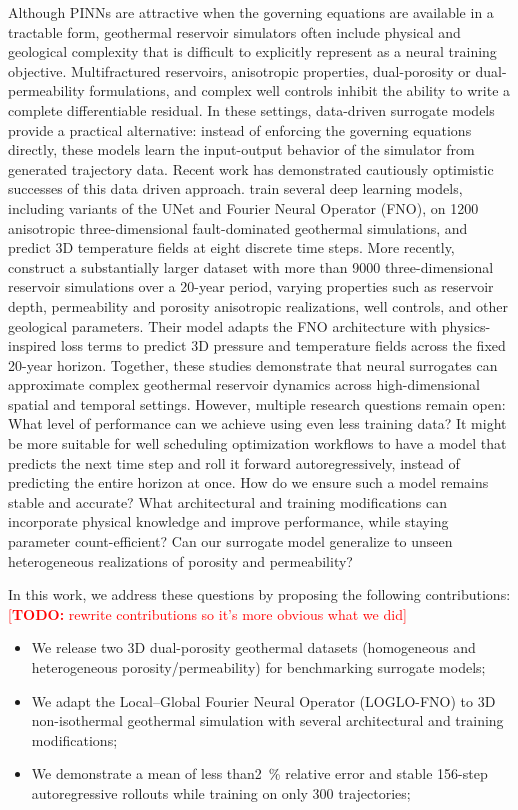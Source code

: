 \documentclass[pdflatex,sn-mathphys-ay]{sn-jnl}
\newcommand{\todo}[1]{\textcolor{red}{[\textbf{TODO:} #1]}}
\begin{document}
Although PINNs are attractive when the governing equations are available in a
tractable form, geothermal reservoir simulators often include physical and
geological complexity that is difficult to explicitly represent as a neural
training objective. Multifractured reservoirs, anisotropic properties,
dual-porosity or dual-permeability formulations, and complex well controls
inhibit the ability to write a
complete differentiable residual. In these settings, data-driven surrogate models
provide a practical alternative: instead of enforcing the governing equations
directly, these models learn the input-output behavior of the simulator from generated
trajectory data. Recent work has demonstrated cautiously optimistic successes 
of this data driven approach. 
\cite{liangSurrogateModelingGeothermal} train several deep learning models,
including variants of the UNet and Fourier Neural Operator (FNO), on 1200 anisotropic
three-dimensional fault-dominated geothermal simulations, and predict 3D
temperature fields at eight discrete time steps.
More recently,\cite{xueRobustPhysicsconstrainedNeural2026} construct a substantially larger
dataset with more than 9000 three-dimensional reservoir simulations over a
20-year period, varying properties such as reservoir depth, permeability and porosity anisotropic realizations, well controls, 
and other geological parameters. Their model adapts the FNO architecture with
physics-inspired loss terms to predict 3D pressure and temperature fields across the fixed
20-year horizon. 
Together, these studies demonstrate that neural surrogates can approximate
complex geothermal reservoir dynamics across high-dimensional spatial and
temporal settings. However, multiple research questions remain open: What level of performance can we achieve
using even less training data? It might be more suitable for well scheduling optimization workflows to have a model that predicts the 
next time step and roll it forward autoregressively, instead of predicting the entire horizon at once. How do we ensure
such a model remains stable and accurate? What architectural and training modifications can incorporate 
physical knowledge and improve performance, while staying parameter count-efficient? Can our surrogate model generalize
to unseen heterogeneous realizations of porosity and permeability?

In this work, we address these questions by proposing the following contributions:
\todo{rewrite contributions so it's more obvious what we did}
\begin{itemize}
  \item We release two 3D dual-porosity geothermal datasets (homogeneous and
        heterogeneous porosity/permeability) for benchmarking surrogate models;
  \item We adapt the Local--Global Fourier Neural Operator (LOGLO-FNO) to 3D
        non-isothermal geothermal simulation with several architectural and
        training modifications;
  \item We demonstrate a mean of less than\SI{2}{\percent} relative error and stable 156-step
        autoregressive rollouts while training on only 300 trajectories;
\end{itemize}
\end{document}
